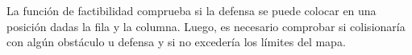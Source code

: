 La función de factibilidad comprueba si la defensa se puede colocar en una posición dadas la fila y la columna. Luego, es necesario comprobar si colisionaría con algún obstáculo u defensa y si no excedería los límites del mapa.
